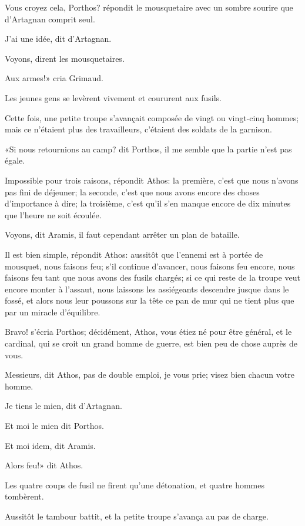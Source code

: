 \speak  Vous croyez cela, Porthos? répondit le mousquetaire avec un sombre sourire que d'Artagnan comprit seul. 

\speak  J'ai une idée, dit d'Artagnan. 

\speak  Voyons, dirent les mousquetaires. 

\speak  Aux armes!» cria Grimaud. 

Les jeunes gens se levèrent vivement et coururent aux fusils. 

Cette fois, une petite troupe s'avançait composée de vingt ou vingt-cinq hommes; mais ce n'étaient plus des travailleurs, c'étaient des soldats de la garnison. 

«Si nous retournions au camp? dit Porthos, il me semble que la partie n'est pas égale. 

\speak  Impossible pour trois raisons, répondit Athos: la première, c'est que nous n'avons pas fini de déjeuner; la seconde, c'est que nous avons encore des choses d'importance à dire; la troisième, c'est qu'il s'en manque encore de dix minutes que l'heure ne soit écoulée. 

\speak  Voyons, dit Aramis, il faut cependant arrêter un plan de bataille. 

\speak  Il est bien simple, répondit Athos: aussitôt que l'ennemi est à portée de mousquet, nous faisons feu; s'il continue d'avancer, nous faisons feu encore, nous faisons feu tant que nous avons des fusils chargés; si ce qui reste de la troupe veut encore monter à l'assaut, nous laissons les assiégeants descendre jusque dans le fossé, et alors nous leur poussons sur la tête ce pan de mur qui ne tient plus que par un miracle d'équilibre. 

\speak  Bravo! s'écria Porthos; décidément, Athos, vous étiez né pour être général, et le cardinal, qui se croit un grand homme de guerre, est bien peu de chose auprès de vous. 

\speak  Messieurs, dit Athos, pas de double emploi, je vous prie; visez bien chacun votre homme. 

\speak  Je tiens le mien, dit d'Artagnan. 

\speak  Et moi le mien dit Porthos. 

\speak  Et moi idem, dit Aramis. 

\speak  Alors feu!» dit Athos. 

Les quatre coups de fusil ne firent qu'une détonation, et quatre hommes tombèrent. 

Aussitôt le tambour battit, et la petite troupe s'avança au pas de charge. 

